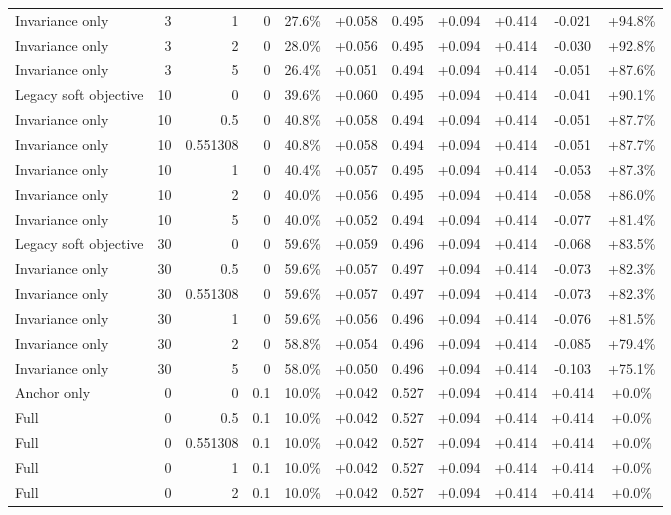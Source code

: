 \begin{table}[htbp]
\begin{tabular}{lrrrccccccc}
Invariance only & 3 & 1 & 0 & 27.6\% & +0.058 & 0.495 & +0.094 & +0.414 & -0.021 & +94.8\% \\
Invariance only & 3 & 2 & 0 & 28.0\% & +0.056 & 0.495 & +0.094 & +0.414 & -0.030 & +92.8\% \\
Invariance only & 3 & 5 & 0 & 26.4\% & +0.051 & 0.494 & +0.094 & +0.414 & -0.051 & +87.6\% \\
Legacy soft objective & 10 & 0 & 0 & 39.6\% & +0.060 & 0.495 & +0.094 & +0.414 & -0.041 & +90.1\% \\
Invariance only & 10 & 0.5 & 0 & 40.8\% & +0.058 & 0.494 & +0.094 & +0.414 & -0.051 & +87.7\% \\
Invariance only & 10 & 0.551308 & 0 & 40.8\% & +0.058 & 0.494 & +0.094 & +0.414 & -0.051 & +87.7\% \\
Invariance only & 10 & 1 & 0 & 40.4\% & +0.057 & 0.495 & +0.094 & +0.414 & -0.053 & +87.3\% \\
Invariance only & 10 & 2 & 0 & 40.0\% & +0.056 & 0.495 & +0.094 & +0.414 & -0.058 & +86.0\% \\
Invariance only & 10 & 5 & 0 & 40.0\% & +0.052 & 0.494 & +0.094 & +0.414 & -0.077 & +81.4\% \\
Legacy soft objective & 30 & 0 & 0 & 59.6\% & +0.059 & 0.496 & +0.094 & +0.414 & -0.068 & +83.5\% \\
Invariance only & 30 & 0.5 & 0 & 59.6\% & +0.057 & 0.497 & +0.094 & +0.414 & -0.073 & +82.3\% \\
Invariance only & 30 & 0.551308 & 0 & 59.6\% & +0.057 & 0.497 & +0.094 & +0.414 & -0.073 & +82.3\% \\
Invariance only & 30 & 1 & 0 & 59.6\% & +0.056 & 0.496 & +0.094 & +0.414 & -0.076 & +81.5\% \\
Invariance only & 30 & 2 & 0 & 58.8\% & +0.054 & 0.496 & +0.094 & +0.414 & -0.085 & +79.4\% \\
Invariance only & 30 & 5 & 0 & 58.0\% & +0.050 & 0.496 & +0.094 & +0.414 & -0.103 & +75.1\% \\
Anchor only & 0 & 0 & 0.1 & 10.0\% & +0.042 & 0.527 & +0.094 & +0.414 & +0.414 & +0.0\% \\
Full & 0 & 0.5 & 0.1 & 10.0\% & +0.042 & 0.527 & +0.094 & +0.414 & +0.414 & +0.0\% \\
Full & 0 & 0.551308 & 0.1 & 10.0\% & +0.042 & 0.527 & +0.094 & +0.414 & +0.414 & +0.0\% \\
Full & 0 & 1 & 0.1 & 10.0\% & +0.042 & 0.527 & +0.094 & +0.414 & +0.414 & +0.0\% \\
Full & 0 & 2 & 0.1 & 10.0\% & +0.042 & 0.527 & +0.094 & +0.414 & +0.414 & +0.0\% \\

\end{tabular}
\end{table}
